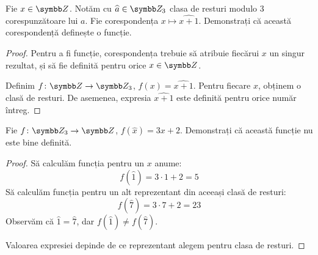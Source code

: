\begin{exercise}
Fie \(x \in \integers\). Notăm cu \(\widehat{a} \in \integersmod{3}\) clasa de resturi modulo \(3\) corespunzătoare lui \(a\).
Fie corespondența \(x \mapsto \widehat{x + 1}\). Demonstrați că această corespondență definește o funcție.
\end{exercise}
\begin{proof}
Pentru a fi funcție, corespondența trebuie să atribuie fiecărui \(x\) un singur rezultat, și să fie definită pentru orice \(x \in \integers\).

Definim \(\function{f}{\integers}{\integersmod{3}}\), \(f(x) = \widehat{x + 1}\). Pentru fiecare \(x\), obținem o clasă de resturi. De asemenea, expresia \(\widehat{x + 1}\) este definită pentru orice număr întreg.
\end{proof}

\begin{exercise}
Fie \(\function{f}{\integersmod{3}}{\integers}\), \(f(\widehat{x}) = 3 x + 2\). Demonstrați că această funcție nu este bine definită.
\end{exercise}
\begin{proof}
Să calculăm funcția pentru un \(x\) anume:
\[
    f(\widehat{1}) = 3 \cdot 1 + 2 = 5
\]
Să calculăm funcția pentru un alt reprezentant din aceeași clasă de resturi:
\[
    f(\widehat{7}) = 3 \cdot 7 + 2 = 23
\]
Observăm că \(\widehat{1} = \widehat{7}\), dar \(f(\widehat{1}) \neq f(\widehat{7})\).

Valoarea expresiei depinde de ce reprezentant alegem pentru clasa de resturi.
\end{proof}

